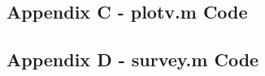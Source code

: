 \documentclass[10pt]{article}
\begin{document}
\subsection*{Appendix C - plotv.m Code}


\pagebreak

\subsection*{Appendix D - survey.m Code}


\pagebreak
\end{document}

